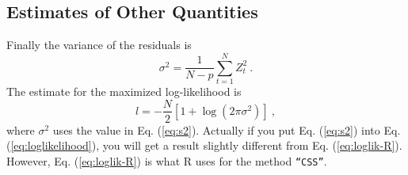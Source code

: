 \subsection{Estimates of  Other Quantities}
Finally the variance of the residuals is
\begin{equation}
\sigma^2 = \frac{1}{N-p}\sum_{t=1}^N Z_t^2\ . \label{eq:s2}
\end{equation}
The estimate for the maximized log-likelihood is
\begin{equation}
l = -\frac{N}{2}\left[1 + \log(2\pi\sigma^2)\right]\ , \label{eq:loglik-R}
\end{equation}
where $\sigma^2$ uses the value in Eq. (\ref{eq:s2}).
Actually if you put Eq. (\ref{eq:s2}) into
Eq. (\ref{eq:loglikelihood}), you will get a result slightly different
from Eq. (\ref{eq:loglik-R}). However, Eq. (\ref{eq:loglik-R}) is what
R uses for the method \texttt{``CSS''}.

